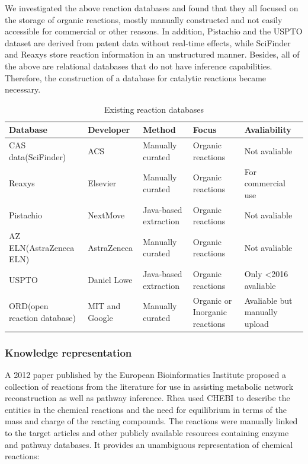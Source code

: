 \documentclass[%
 aip,
 jmp,%
 amsmath,amssymb,
 reprint,%
]{revtex4-2}
\begin{document}
We investigated the above reaction databases and found that they all focused on the storage of organic reactions, mostly manually constructed and not easily accessible for commercial or other reasons. In addition, Pistachio and the USPTO dataset are derived from patent data without real-time effects, while SciFinder and Reaxys store reaction information in an unstructured manner. Besides, all of the above are relational databases that do not have inference capabilities. Therefore, the construction of a database for catalytic reactions became necessary.

\begin{table}[h!]
\begin{tabular}{ |p{3cm}|p{3cm}|p{3cm}|p{3cm}|p{3cm}|  }
\hline
Database&Developer&Method&Focus&Avaliability\\ \hline
CAS data(SciFinder)& ACS    &Manually curated&   Organic reactions&Not avaliable\\ \hline
Reaxys&   Elsevier  & Manually curated   &Organic reactions&For commercial use\\ \hline
Pistachio & NextMove & Java-based extraction &  Organic reactions&Not avaliable\\ \hline
AZ ELN(AstraZeneca ELN)    &AstraZeneca & Manually curated&  Organic reactions&Not avaliable\\ \hline
USPTO&   Daniel Lowe  & Java-based extraction&Organic reactions&Only <2016 avaliable\\ \hline
ORD(open reaction database) & MIT and Google  & Manually curated   &Organic or Inorganic reactions&Avaliable but manually upload\\ \hline
\end{tabular}
\caption{Existing reaction databases}
\label{ table.1 }
\end{table}

\subsubsection{Knowledge representation}

A 2012 paper published by the European Bioinformatics Institute proposed a collection of reactions from the literature for use in assisting metabolic network reconstruction as well as pathway inference\cite{alcantara2012rhea}. Rhea used CHEBI\cite{degtyarenko2007chebi} to describe the entities in the chemical reactions and the need for equilibrium in terms of the mass and charge of the reacting compounds. The reactions were manually linked to the target articles and other publicly available resources containing enzyme and pathway databases\cite{karp2001pathway, bauer2009pathway, fleischmann2004intenz, uniprot2010ongoing, kanehisa2010kegg, matthews2009reactome, holliday2007macie, morgat2012unipathway}. It provides an unambiguous representation of chemical reactions:
\end{document}
